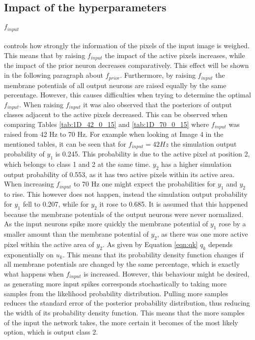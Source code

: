 \subsection{Impact of the hyperparameters}
\label{subsection:impactHyper}
\paragraph{$f_{input}$} controls how strongly the information of the pixels of the input image is weighed. This means that by raising $f_{input}$ the impact of the active pixels increases, while the impact of the prior neuron decreases comparatively. This effect will be shown in the following paragraph about $f_{prior}$. Furthermore, by raising $f_{input}$ the membrane potentials of all output neurons are raised equally by the same percentage. However, this causes difficulties when trying to determine the optimal $f_{input}$. When raising $f_{input}$ it was also observed that the posteriors of output classes adjacent to the active pixels decreased. This can be observed when comparing Tables \ref{tab:1D_42_0_15} and \ref{tab:1D_70_0_15} where $f_{input}$ was raised from 42 Hz to 70 Hz. For example when looking at Image 4 in the mentioned tables, it can be seen that for $f_{input} = 42 Hz$ the simulation output probability of $y_1$ is 0.245. This probability is due to the active pixel at position 2, which belongs to class 1 and 2 at the same time. $y_2$ has a higher simulation output probability of 0.553, as it has two active pixels within its active area. When increasing $f_{input}$ to 70 Hz one might expect the probabilities for $y_1$ and $y_2$ to rise. This however does not happen, instead the simulation output probability for $y_1$ fell to 0.207, while for $y_2$ it rose to 0.685. It is assumed that this happened because the membrane potentials of the output neurons were never normalized. As the input neurons spike more quickly the membrane potential of $y_1$ rose by a smaller amount than the membrane potential of $y_2$, as there was one more active pixel within the active area of $y_2$. As given by Equation \ref{eqn:qk} $q_k$ depends exponentially on $u_k$. This means that its probability density function changes if all membrane potentials are changed by the same percentage, which is exactly what happens when $f_{input}$ is increased. However, this behaviour might be desired, as generating more input spikes corresponds stochastically to taking more samples from the likelihood probability distribution. Pulling more samples reduces the standard error of the posterior probability distribution, thus reducing the width of its probability density function. This means that the more samples of the input the network takes, the more certain it becomes of the most likely option, which is output class 2.


